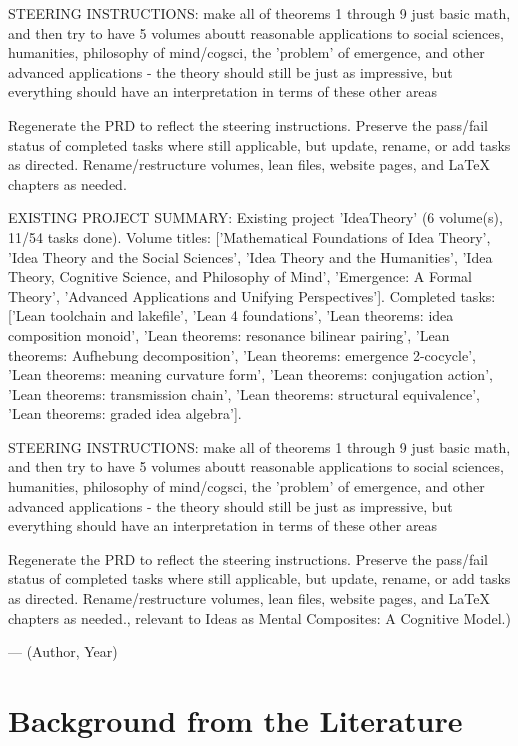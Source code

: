{STEERING INSTRUCTIONS: make all of theorems 1 through 9 just basic math, and then try to have 5 volumes aboutt reasonable applications to social sciences, humanities, philosophy of mind/cogsci, the 'problem' of emergence, and other advanced applications - the theory should still be just as impressive, but everything should have an interpretation in terms of these other areas

Regenerate the PRD to reflect the steering instructions. Preserve the pass/fail status of completed tasks where still applicable, but update, rename, or add tasks as directed. Rename/restructure volumes, lean files, website pages, and LaTeX chapters as needed.

EXISTING PROJECT SUMMARY: Existing project 'IdeaTheory' (6 volume(s), 11/54 tasks done). Volume titles: ['Mathematical Foundations of Idea Theory', 'Idea Theory and the Social Sciences', 'Idea Theory and the Humanities', 'Idea Theory, Cognitive Science, and Philosophy of Mind', 'Emergence: A Formal Theory', 'Advanced Applications and Unifying Perspectives']. Completed tasks: ['Lean toolchain and lakefile', 'Lean 4 foundations', 'Lean theorems: idea composition monoid', 'Lean theorems: resonance bilinear pairing', 'Lean theorems: Aufhebung decomposition', 'Lean theorems: emergence 2-cocycle', 'Lean theorems: meaning curvature form', 'Lean theorems: conjugation action', 'Lean theorems: transmission chain', 'Lean theorems: structural equivalence', 'Lean theorems: graded idea algebra'].

STEERING INSTRUCTIONS: make all of theorems 1 through 9 just basic math, and then try to have 5 volumes aboutt reasonable applications to social sciences, humanities, philosophy of mind/cogsci, the 'problem' of emergence, and other advanced applications - the theory should still be just as impressive, but everything should have an interpretation in terms of these other areas

Regenerate the PRD to reflect the steering instructions. Preserve the pass/fail status of completed tasks where still applicable, but update, rename, or add tasks as directed. Rename/restructure volumes, lean files, website pages, and LaTeX chapters as needed., relevant to Ideas as Mental Composites: A Cognitive Model.)}{--- (Author, Year)}

        \section{Background from the Literature}
        \label{sec:v4c7.lit}

